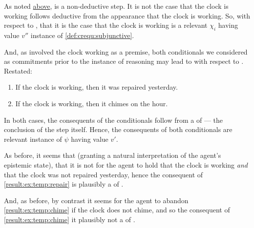 \begin{note}
  As noted \hyperref[step-a-non-deductive]{above}, \CStepA{} is a non-deductive step.
  It is not the case that the clock is working follows deductive from the appearance that the clock is working.
  So, with respect to \CStepA{}, that it is the case that the clock is working is a relevant \(\chi_{i}\) having value \(v''\) instance of \ref{def:crequ:subjunctive}.

  And, as \CStepB{} involved the clock working as a premise, both conditionals we considered as commitments prior to the instance of reasoning may lead to  with respect to \CStepA{}.
  Restated:

  \begin{enumerate}[label=A\(^{+}\)\arabic*., ref=(A\(^{+}\)\arabic*)]
  \item
    \label{result:ex:temp:repair}
    If the clock is working, then it was repaired yesterday.
  \item
    \label{result:ex:temp:chime}
    If the clock is working, then it chimes on the hour.
  \end{enumerate}

  In both cases, the consequents of the conditionals follow from a \crequ{} of \CStepA{} --- the conclusion of the step itself.
  Hence, the consequents of both conditionals are relevant instance of \(\psi\) having value \(v'\).

  As before, it seems that (granting a natural interpretation of the agent's epistemic state), that it is not \epAdv{} for the agent to hold that the clock is working \emph{and} that the clock was not repaired yesterday, hence the consequent of \ref{result:ex:temp:repair} is plausibly a \cprequ{} of \CStepA{}.

  And, as before, by contrast it seems \epAdv{} for the agent to abandon \ref{result:ex:temp:chime} if the clock does not chime, and so the consequent of \ref{result:ex:temp:chime} it plausibly not a \cprequ{} of \CStepA{}.
\end{note}

\hozline

